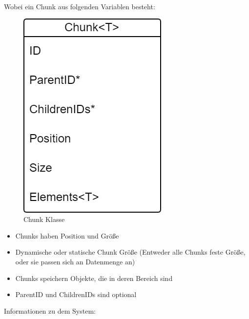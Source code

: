 Wobei ein Chunk aus folgenden Variablen besteht:
\begin{figure}[H]
    \centering
    \includegraphics[scale=0.5]{images/Chunk.png}
    \caption{Chunk Klasse}
    \label{fig:chunkClass}
\end{figure}

\begin{itemize}
    \item Chunks haben Position und Größe
    \item Dynamische oder statische Chunk Größe (Entweder alle Chunks feste Größe, oder sie passen sich an Datenmenge an)
    \item Chunks speichern Objekte, die in deren Bereich sind
    \item ParentID und ChildrenIDs sind optional
\end{itemize}

Informationen zu dem System:

